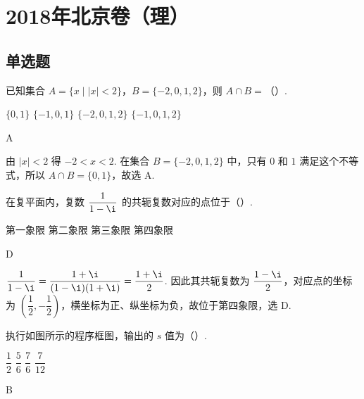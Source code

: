 \chapter{2018年北京卷（理）}

\section{单选题}

\begin{problem}
已知集合 \(A=\{x\mid |x|<2\}\)，\(B=\{-2,0,1,2\}\)，则 \(A\cap B=\)（\quad）.

\choices
    {\(\{0,1\}\)}
    {\(\{-1,0,1\}\)}
    {\(\{-2,0,1,2\}\)}
    {\(\{-1,0,1,2\}\)}
\end{problem}

\begin{answer}
A
\end{answer}

\begin{solution}
由 \( |x|<2 \) 得 \(-2<x<2\). 在集合 \(B=\{-2,0,1,2\}\) 中，只有 \(0\) 和 \(1\) 满足这个不等式，所以
\(A\cap B=\{0,1\}\)，故选 A.
\end{solution}

\begin{problem}
在复平面内，复数 \(\dfrac{1}{1-\i}\) 的共轭复数对应的点位于（\quad）.

\choices
    {第一象限}
    {第二象限}
    {第三象限}
    {第四象限}
\end{problem}

\begin{answer}
D
\end{answer}

\begin{solution}
\(\dfrac{1}{1-\i}=\dfrac{1+\i}{(1-\i)(1+\i)}=\dfrac{1+\i}{2}\).
因此其共轭复数为 \(\dfrac{1-\i}{2}\)，对应点的坐标为 \(\left(\dfrac12,-\dfrac12\right)\)，横坐标为正、纵坐标为负，故位于第四象限，选 D.
\end{solution}

\begin{problem}
执行如图所示的程序框图，输出的 \(s\) 值为（\quad）.


\choices
    {\(\dfrac12\)}
    {\(\dfrac56\)}
    {\(\dfrac76\)}
    {\(\dfrac{7}{12}\)}
\end{problem}

\begin{answer}
B
\end{answer}

